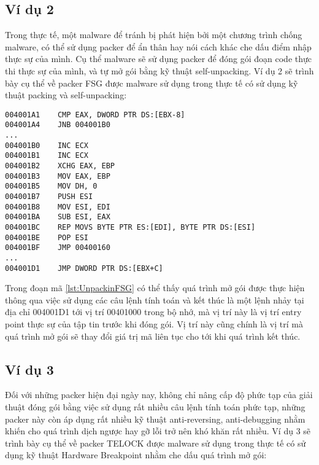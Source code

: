 \subsection{Ví dụ 2}

\hspace{0.5cm}Trong thực tế, một malware để tránh bị phát hiện bởi một chương trình chống malware, có thể sử dụng packer để ẩn thân hay nói cách khác che dấu điểm nhập thực sự của mình. Cụ thể malware sẽ sử dụng packer để đóng gói đoạn code thực thi thực sự của mình, và tự mở gói bằng kỹ thuật self-unpacking. Ví dụ 2 sẽ trình bày cụ thể về packer FSG được malware sử dụng trong thực tế có sử dụng kỹ thuật packing và self-unpacking:

\begin{code}
\begin{lstlisting}[captionpos=b,caption={Kỹ thuật Unpacking sử dụng trong packer FSG},label={lst:UnpackinFSG},frame=single]
004001A1	CMP EAX, DWORD PTR DS:[EBX-8]
004001A4	JNB 004001B0
...
004001B0	INC ECX
004001B1	INC ECX
004001B2	XCHG EAX, EBP
004001B3	MOV EAX, EBP
004001B5	MOV DH, 0
004001B7	PUSH ESI
004001B8	MOV ESI, EDI
004001BA	SUB ESI, EAX
004001BC	REP MOVS BYTE PTR ES:[EDI], BYTE PTR DS:[ESI]
004001BE	POP ESI
004001BF 	JMP 00400160		
...
004001D1	JMP DWORD PTR DS:[EBX+C]
\end{lstlisting}
\end{code} 

\hspace{0.5cm}Trong đoạn mã \ref {lst:UnpackinFSG} có thể thấy quá trình mở gói được thực hiện thông qua việc sử dụng các câu lệnh tính toán và kết thúc là một lệnh nhảy tại địa chỉ 004001D1 tới vị trí 00401000 trong bộ nhớ, mà vị trí này là vị trí entry point thực sự của tập tin trước khi đóng gói. Vị trí này cũng chính là vị trí mà quá trình mở gói sẽ thay đổi giá trị mã liên tục cho tới khi quá trình kết thúc. 

\subsection{Ví dụ 3}

\hspace{0.5cm}Đối với những packer hiện đại ngày nay, không chỉ nâng cấp độ phức tạp của giải thuật đóng gói bằng việc sử dụng rất nhiều câu lệnh tính toán phức tạp, những packer này còn áp dụng rất nhiều kỹ thuật anti-reversing, anti-debugging nhằm khiến cho quá trình dịch ngược hay gỡ lỗi trở nên khó khăn rất nhiều. Ví dụ 3 sẽ trình bày cụ thể về packer TELOCK được malware sử dụng trong thực tế có sử dụng kỹ thuật Hardware Breakpoint nhằm che dấu quá trình mở gói:

